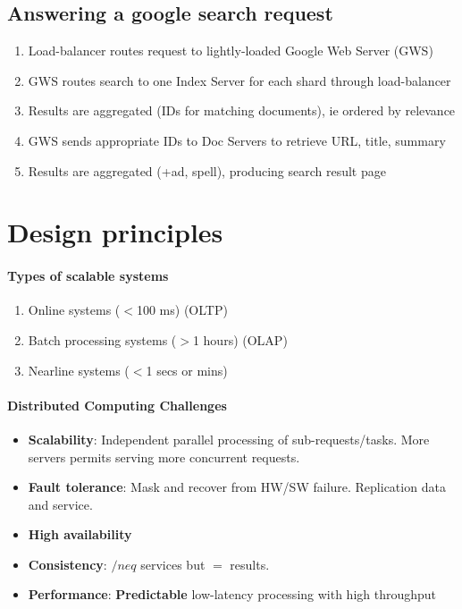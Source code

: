 \subsection{Answering a google search request}
\begin{enumerate}
\item Load-balancer routes request to lightly-loaded Google Web Server (GWS)
\item GWS routes search to one Index Server for each shard through load-balancer
\item Results are aggregated (IDs for matching documents), ie ordered by
  relevance
\item GWS sends appropriate IDs to Doc Servers to retrieve URL, title, summary
\item Results are aggregated (+ad, spell), producing search result page
\end{enumerate}

\section{Design principles}
\paragraph{Types of scalable systems}
\begin{enumerate}
\item Online systems ($<$100 ms) (OLTP)
\item Batch processing systems ($>$1 hours) (OLAP)
\item Nearline systems ($<$1 secs or mins)
\end{enumerate}

\paragraph{Distributed Computing Challenges}
\begin{itemize}
\item \textbf{Scalability}: Independent parallel processing of
  sub-requests/tasks. More servers permits serving more concurrent requests.
\item \textbf{Fault tolerance}: Mask and recover from HW/SW failure. Replication
  data and service.
\item \textbf{High availability}
\item \textbf{Consistency}: $/neq$ services but $=$ results.
\item \textbf{Performance}: \textbf{Predictable} low-latency processing with
  high throughput
\end{itemize}

